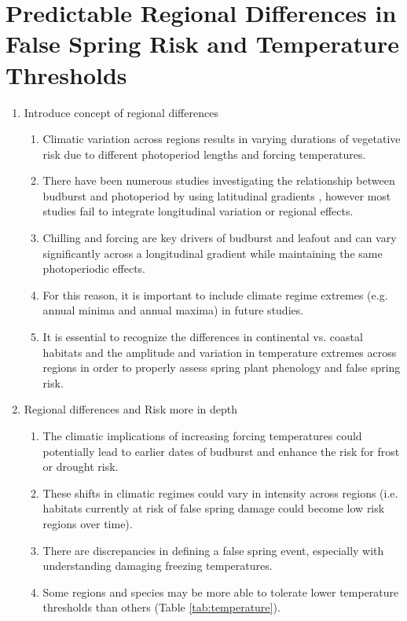 \documentclass{article}\usepackage[]{graphicx}\usepackage[]{color}
\begin{document}
\section*{Predictable Regional Differences in False Spring Risk and Temperature Thresholds}
\begin{enumerate}
\item Introduce concept of regional differences
\begin {enumerate}
\item Climatic variation across regions results in varying durations of vegetative risk due to different photoperiod lengths and forcing temperatures.
\item There have been numerous studies investigating the relationship between budburst and photoperiod by using latitudinal gradients \citep{Partanen2004, Viheraaarnio2006, Caffarra2011, Zohner2016, Gauzere2017}, however most studies fail to integrate longitudinal variation or regional effects.
\item Chilling and forcing are key drivers of budburst and leafout and can vary significantly across a  longitudinal gradient while maintaining the same photoperiodic effects. %
\item For this reason, it is important to include climate regime extremes (e.g. annual minima and annual maxima) in future studies.
\item It is essential to recognize the differences in continental vs. coastal habitats and the amplitude and variation in temperature extremes across regions in order to properly assess spring plant phenology and false spring risk.
\end{enumerate}
\item Regional differences and Risk more in depth
\begin{enumerate}
\item The climatic implications of increasing forcing temperatures could potentially lead to earlier dates of budburst and enhance the risk for frost or drought risk.
\item These shifts in climatic regimes could vary in intensity across regions (i.e. habitats currently at risk of false spring damage could become low risk regions over time). 
\item There are discrepancies in defining a false spring event, especially with understanding damaging freezing temperatures.
\item Some regions and species may be more able to tolerate lower temperature thresholds than others (Table \ref{tab:temperature}).

\end{enumerate}
\end{enumerate}
\end{document}
